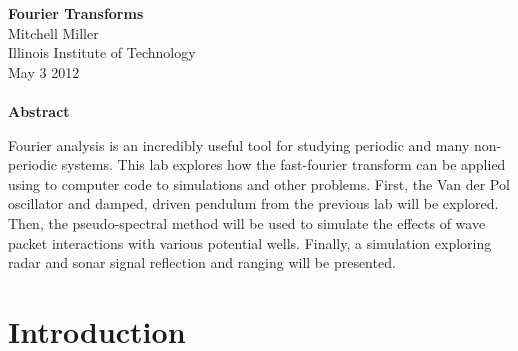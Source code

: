 \documentclass[12pt]{article}
\begin{document}
\begin{center}
\textbf{Fourier Transforms} \\ 
Mitchell Miller \\
Illinois Institute of Technology \\
May 3 2012 {\ \\ \ \\}
\textbf{Abstract}\\
\end{center}
\noindent
Fourier analysis is an incredibly useful tool for studying periodic and many non-periodic systems.  This lab explores how the fast-fourier transform can be applied using to computer code to simulations and other problems.  First, the Van der Pol oscillator and damped, driven pendulum from the previous lab will be explored.  Then, the pseudo-spectral method will be used to simulate the effects of wave packet interactions with various potential wells.  Finally, a simulation exploring radar and sonar signal reflection and ranging will be presented.

\pagebreak

\section{Introduction}
\end{document}
